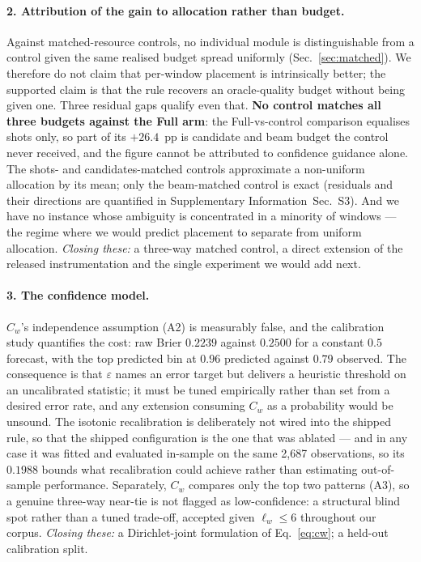 \documentclass[preprint,11pt]{elsarticle}
\newcommand{\SI}{Supplementary Information}
\newcommand{\SItables}{\SI{}~Sec.~S3}
\newcommand{\Cw}{C_w}
\begin{document}
\paragraph{2. Attribution of the gain to allocation rather than budget.}
Against matched-resource controls, no individual module is
distinguishable from a control given the same realised budget spread
uniformly (Sec.~\ref{sec:matched}). We therefore do not claim that
per-window placement is intrinsically better; the supported claim is that
the rule recovers an oracle-quality budget without being given one. Three
residual gaps qualify even that. \textbf{No control matches all three
budgets against the Full arm}: the Full-vs-control comparison equalises
shots only, so part of its $+26.4$~pp is candidate and beam budget the
control never received, and the figure cannot be attributed to confidence
guidance alone. The shots- and candidates-matched controls approximate a
non-uniform allocation by its mean; only the beam-matched control is
exact (residuals and their directions are quantified in \SItables{}). And
we have no instance whose ambiguity is concentrated in a minority of
windows --- the regime where we would predict placement to separate from
uniform allocation. \emph{Closing these:} a three-way matched control, a
direct extension of the released instrumentation and the single
experiment we would add next.

\paragraph{3. The confidence model.}
$\Cw$'s independence assumption (A2) is measurably false, and the
calibration study quantifies the cost: raw Brier $0.2239$ against
$0.2500$ for a constant $0.5$ forecast, with the top predicted bin at
$0.96$ predicted against $0.79$ observed. The consequence is that
$\varepsilon$ names an error target but delivers a heuristic threshold on
an uncalibrated statistic; it must be tuned empirically rather than set
from a desired error rate, and any extension consuming $\Cw$ as a
probability would be unsound. The isotonic recalibration is deliberately
not wired into the shipped rule, so that the shipped configuration is the
one that was ablated --- and in any case it was fitted and evaluated
in-sample on the same 2{,}687 observations, so its $0.1988$ bounds what
recalibration could achieve rather than estimating out-of-sample
performance. Separately, $\Cw$ compares only the top two patterns (A3),
so a genuine three-way near-tie is not flagged as low-confidence: a
structural blind spot rather than a tuned trade-off, accepted given
$\ell_w\le6$ throughout our corpus. \emph{Closing these:} a
Dirichlet-joint formulation of Eq.~\eqref{eq:cw}; a held-out calibration
split.
\end{document}
